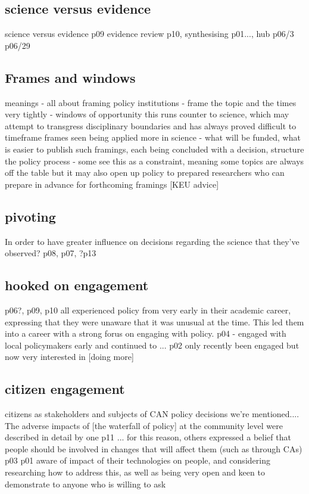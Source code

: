 



\subsection{science versus evidence}
science versus evidence p09
evidence review p10, synthesising p01..., hub p06/3 p06/29

\subsection{Frames and windows}
meanings - all about framing
policy institutions - frame the topic and the times very tightly - windows of opportunity
this runs counter to science, which may attempt to transgress disciplinary boundaries and has always proved difficult to timeframe
frames seen being applied more in science - what will be funded, what is easier to publish
such framings, each being concluded with a decision, structure the policy process
- some see this as a constraint, meaning some topics are always off the table but it may also open up policy to prepared researchers who can prepare in advance for forthcoming framings [KEU advice]

\subsection{pivoting}
In order to have greater influence on decisions regarding the science that they've observed?
p08, p07, ?p13

\subsection{hooked on engagement}
p06?, p09, p10 all experienced policy from very early in their academic career, expressing that they were unaware that it was unusual at the time. This led them into a career with a strong forus on engaging with policy. p04 - engaged with local policymakers early and continued to ... p02 only recently been engaged but now very interested in [doing more]

\subsection{citizen engagement}
citizens as stakeholders and subjects of CAN policy decisions we're mentioned.... The adverse impacts of [the waterfall of policy] at the community level were described in detail by one p11 ... for this reason, others expressed a belief that people should be involved in changes that will affect them (such as through CAs) p03  p01 aware of impact of their technologies on people, and considering researching how to address this, as well as being very open and keen to demonstrate to anyone who is willing to ask

